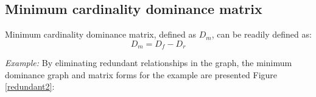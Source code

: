 \documentclass[12pt,english]{report}
\begin{document}
\subsection{Minimum cardinality dominance matrix}
Minimum cardinality dominance matrix, defined as $D_m$, can be readily defined as: $$D_m = D_f - D_r $$

\vspace{0.15in}
\noindent \textit{Example:} By eliminating redundant relationships in the graph, the minimum dominance graph and matrix forms for the example are presented Figure \ref{redundant2}:

\begin{figure}
    \begin{floatrow}
    \capbtabbox{%
    \begin{tabular}{l|llllll}
        & 1 & 2 & 3 & 4 & 5 & 6 \\ \hline
        1 & 0 & 0 & 0 & 0 & 0 & 0 \\
        2 & 1 & 0 & 0 & 1 & 1 & 0 \\
        3 & 0 & 1 & 0 & 0 & 0 & 0 \\
        4 & 0 & 0 & 0 & 0 & 0 & 0 \\
        5 & 0 & 0 & 0 & 0 & 0 & 0 \\
        6 & 0 & 1 & 0 & 0 & 0 & 0
    \end{tabular}
        \label{domin_matrix3}%
    }{%
    \caption{Minimum dominance in matrix}%
    \label{redundant2}
}
\end{floatrow}
\end{figure}
\end{document}
